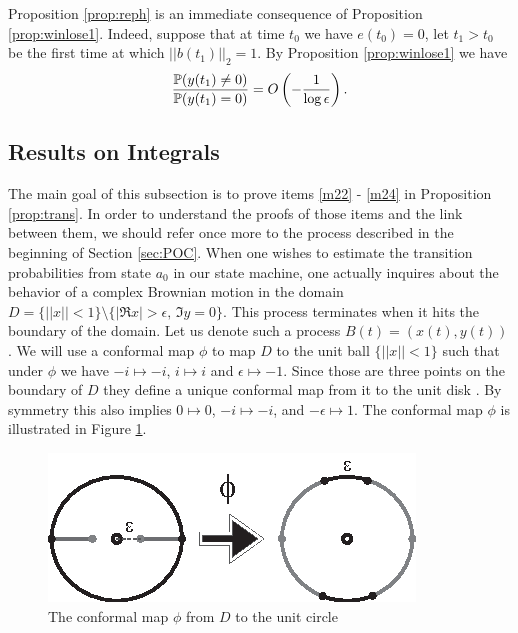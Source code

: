 {Proposition \ref{prop:reph} is an immediate consequence of Proposition
\ref{prop:winlose1}. Indeed, suppose that at time $t_0$ we have
$e(t_0)=0$, let $t_1>t_0$ be the first time at which $||b(t_1)||_2=1$.
By Proposition \ref{prop:winlose1} we have
$$\frac{\P (y(t_1)\neq0)}{\P (y(t_1)=0)}=O\left(-\frac 1 {\log\epsilon}\right).$$

\subsection{Results on Integrals}\label{sec:ROI}

The main goal of this subsection is to prove items \ref{m22} - \ref{m24} in Proposition
 \ref{prop:trans}. In order to understand the proofs of those items and the link
  between them, we should refer once more to the process described in the
   beginning of Section \ref{sec:POC}. When one wishes to estimate the
   transition probabilities from state $a_0$ in our state machine, one
   actually inquires about the behavior of a complex Brownian motion in
   the domain $D=\{||x||<1\}\setminus\{|\Re x|>\epsilon,\,\Im y=0\}$. This
   process terminates when it hits the boundary of the domain. Let us
   denote such a process $B(t)=(x(t),y(t))$. We will use a conformal
    map $\phi$ to map $D$ to the unit ball $\{||x||<1\}$ such that
    under $\phi$ we have $-i \mapsto-i$, $i\mapsto i$ and
    $\epsilon\mapsto-1$. Since those are three points on the
     boundary of $D$ they define a unique conformal map from it
      to the unit disk . By symmetry
      this also implies $0\mapsto0$, $-i\mapsto -i$, and
       $-\epsilon\mapsto1$. The conformal map $\phi$ is
       illustrated in Figure \ref{fig:conf_map}.
\begin{figure}[htb]
\begin{center}
\leavevmode
\includegraphics{conformal_map.eps}
\end{center}
\caption{The conformal map $\phi$ from $D$ to the unit circle}
\label{fig:conf_map}
\end{figure}

}
